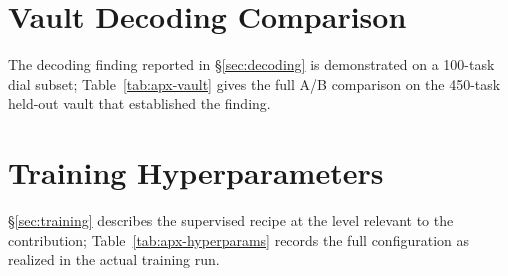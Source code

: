 \section{Vault Decoding Comparison}
\label{apx:vault}

The decoding finding reported in \S\ref{sec:decoding} is demonstrated on
a 100-task dial subset; Table~\ref{tab:apx-vault} gives the full A/B
comparison on the 450-task held-out vault that established the finding.

\begin{table}[H]
\centering
\footnotesize
\caption{\textbf{Sampled decoding is what makes the searcher commit.}
The same checkpoint on $450$ held-out issues, greedy versus temperature
$0.9$.  Find rate nearly triples, from higher commitment
($72\%$ vs.\ $21\%$) against an 18\% drop in per-handoff recall.  The
greedy arm lost $24$ episodes to infrastructure timeouts; the
$2.65\times$ figure adjusts for this.  The vault is excluded from all
training data.}
\label{tab:apx-vault}

\end{table}



\section{Training Hyperparameters}
\label{apx:hyperparams}

\S\ref{sec:training} describes the supervised recipe at the level
relevant to the contribution; Table~\ref{tab:apx-hyperparams} records the
full configuration as realized in the actual training run.

\begin{table}[H]
\centering
\footnotesize
\caption{\textbf{Supervised fine-tuning configuration, as run.}
Rank-$64$ LoRA on every linear projection, trained in  for
two epochs on packed $32$k-token blocks at $91.7\%$ fill; loss is on
assistant turns only.  All values are the realized run, not the planned
recipe.  The complete run cost \$86 of GPU time and peaked at
$24.2$\,GB.}
\label{tab:apx-hyperparams}

\end{table}

